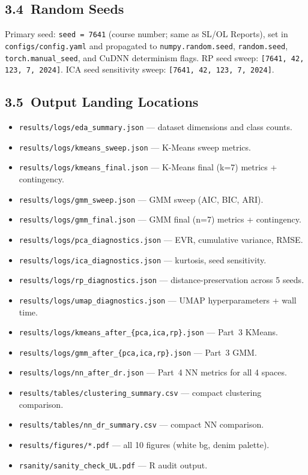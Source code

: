 \documentclass[11pt]{article}
\begin{document}
\subsection*{3.4\ Random Seeds}

Primary seed: \texttt{seed~=~7641} (course number; same as SL/OL Reports),
set in \texttt{configs/config.yaml} and propagated to
\texttt{numpy.random.seed}, \texttt{random.seed},
\texttt{torch.manual\_seed}, and CuDNN determinism flags.
RP seed sweep: \texttt{[7641, 42, 123, 7, 2024]}.
ICA seed sensitivity sweep: \texttt{[7641, 42, 123, 7, 2024]}.

\subsection*{3.5\ Output Landing Locations}
\begin{itemize}
  \item \texttt{results/logs/eda\_summary.json} --- dataset dimensions and class counts.
  \item \texttt{results/logs/kmeans\_sweep.json} --- K-Means sweep metrics.
  \item \texttt{results/logs/kmeans\_final.json} --- K-Means final (k=7) metrics + contingency.
  \item \texttt{results/logs/gmm\_sweep.json} --- GMM sweep (AIC, BIC, ARI).
  \item \texttt{results/logs/gmm\_final.json} --- GMM final (n=7) metrics + contingency.
  \item \texttt{results/logs/pca\_diagnostics.json} --- EVR, cumulative variance, RMSE.
  \item \texttt{results/logs/ica\_diagnostics.json} --- kurtosis, seed sensitivity.
  \item \texttt{results/logs/rp\_diagnostics.json} --- distance-preservation across 5 seeds.
  \item \texttt{results/logs/umap\_diagnostics.json} --- UMAP hyperparameters + wall time.
  \item \texttt{results/logs/kmeans\_after\_\{pca,ica,rp\}.json} --- Part~3 KMeans.
  \item \texttt{results/logs/gmm\_after\_\{pca,ica,rp\}.json} --- Part~3 GMM.
  \item \texttt{results/logs/nn\_after\_dr.json} --- Part~4 NN metrics for all 4 spaces.
  \item \texttt{results/tables/clustering\_summary.csv} --- compact clustering comparison.
  \item \texttt{results/tables/nn\_dr\_summary.csv} --- compact NN comparison.
  \item \texttt{results/figures/*.pdf} --- all 10 figures (white bg, denim palette).
  \item \texttt{rsanity/sanity\_check\_UL.pdf} --- R audit output.
\end{itemize}
\end{document}
